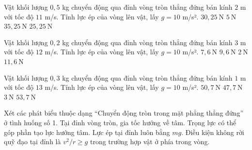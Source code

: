 \begin{ex}
Vật khối lượng $0,5$ kg chuyển động qua đỉnh vòng tròn thẳng đứng bán kính $2$ m với tốc độ $11$ m/s. Tính lực ép của vòng lên vật, lấy $g=10$ m/s².
\choice
{$30,25\ \mathrm{N}$}
{$5\ \mathrm{N}$}
{$35,25\ \mathrm{N}$}
{\True $25,25\ \mathrm{N}$}
\end{ex}

\begin{ex}
Vật khối lượng $0,2$ kg chuyển động qua đỉnh vòng tròn thẳng đứng bán kính $3$ m với tốc độ $12$ m/s. Tính lực ép của vòng lên vật, lấy $g=10$ m/s².
\choice
{\True $7,6\ \mathrm{N}$}
{$9,6\ \mathrm{N}$}
{$2\ \mathrm{N}$}
{$11,6\ \mathrm{N}$}
\end{ex}

\begin{ex}
Vật khối lượng $0,3$ kg chuyển động qua đỉnh vòng tròn thẳng đứng bán kính $1$ m với tốc độ $13$ m/s. Tính lực ép của vòng lên vật, lấy $g=10$ m/s².
\choice
{$50,7\ \mathrm{N}$}
{\True $47,7\ \mathrm{N}$}
{$3\ \mathrm{N}$}
{$53,7\ \mathrm{N}$}
\end{ex}

\begin{ex}
Xét các phát biểu thuộc dạng “Chuyển động tròn trong mặt phẳng thẳng đứng” ở tình huống số 1.
\choiceTF
{\True Tại đỉnh vòng tròn, gia tốc hướng về tâm.}
{\True Trọng lực có thể góp phần tạo lực hướng tâm.}
{Lực ép tại đỉnh luôn bằng $mg$.}
{\True Điều kiện không rời quỹ đạo tại đỉnh là $v^2/r\ge g$ trong trường hợp vật ở phía trong vòng.}
\end{ex}

